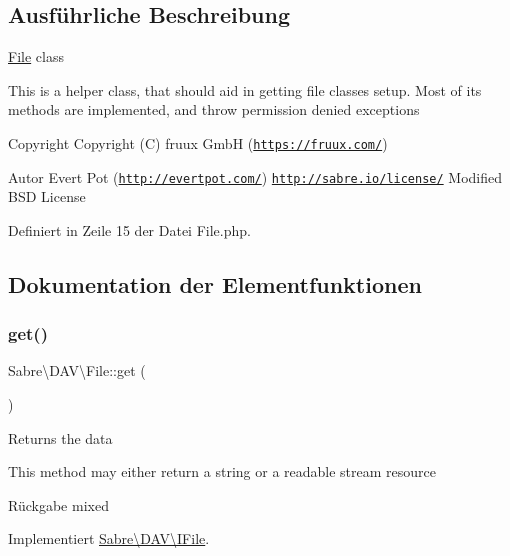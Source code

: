 \subsection{Ausführliche Beschreibung}
\mbox{\hyperlink{class_sabre_1_1_d_a_v_1_1_file}{File}} class

This is a helper class, that should aid in getting file classes setup. Most of its methods are implemented, and throw permission denied exceptions

\begin{DoxyCopyright}{Copyright}
Copyright (C) fruux GmbH (\href{https://fruux.com/}{\tt https\+://fruux.\+com/}) 
\end{DoxyCopyright}
\begin{DoxyAuthor}{Autor}
Evert Pot (\href{http://evertpot.com/}{\tt http\+://evertpot.\+com/})  \href{http://sabre.io/license/}{\tt http\+://sabre.\+io/license/} Modified B\+SD License 
\end{DoxyAuthor}


Definiert in Zeile 15 der Datei File.\+php.



\subsection{Dokumentation der Elementfunktionen}
\mbox{\label{class_sabre_1_1_d_a_v_1_1_file_a0879cd6cff2723f41eb31dae59bc63d0}} 
\subsubsection{\texorpdfstring{get()}{get()}}
{\footnotesize\ttfamily Sabre\textbackslash{}\+D\+A\+V\textbackslash{}\+File\+::get (\begin{DoxyParamCaption}{ }\end{DoxyParamCaption})}

Returns the data

This method may either return a string or a readable stream resource

\begin{DoxyReturn}{Rückgabe}
mixed 
\end{DoxyReturn}


Implementiert \mbox{\hyperlink{interface_sabre_1_1_d_a_v_1_1_i_file_a3102812af0567c3cfd9cd6c20104bd27}{Sabre\textbackslash{}\+D\+A\+V\textbackslash{}\+I\+File}}.



